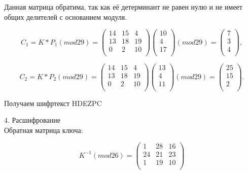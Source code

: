 \documentclass[a4paper]{article}
\begin{document}
Данная матрица обратима, так как её детерминант не равен нулю и не имеет общих делителей с основанием модуля.

\[
    C_1=K*P_1 (mod 29)=
    \begin{pmatrix}
        14 & 15 & 4 \\
        13 & 18 & 19 \\
        0 & 2 & 10 \\
    \end{pmatrix}
    \begin{pmatrix}
        10 \\
        4 \\
        17 \\
    \end{pmatrix}
    (mod 29) =
    \begin{pmatrix}
        7 \\
        3 \\
        4 \\
    \end{pmatrix}
    ,
\]

\[
    C_2=K*P_2 (mod 29)=
    \begin{pmatrix}
        14 & 15 & 4 \\
        13 & 18 & 19 \\
        0 & 2 & 10 \\
    \end{pmatrix}
    \begin{pmatrix}
        13 \\
        4 \\
        11 \\
    \end{pmatrix}
    (mod 29) =
    \begin{pmatrix}
        25 \\
        15 \\
        2 \\
    \end{pmatrix}
    .
\]

Получаем шифртекст HDEZPC

4. Расшифрование \\
Обратная матрица ключа: 

\[
    K^{-1} (mod 26)=
    \begin{pmatrix}
        1 & 28 & 16 \\
        24 & 21 & 23 \\
        1 & 19 & 10 \\
    \end{pmatrix}
\]
\end{document}

